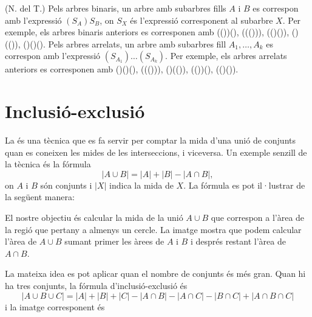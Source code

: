 (N. del T.) Pels arbres binaris, un arbre amb subarbres fills $A$ i
$B$ es correspon amb l'expressió $(S_A)S_B$, on $S_X$ és l'expressió
corresponent al subarbre $X$. Per exemple, els arbres binaris anteriors es
corresponen amb (())(), ((())), (()()), ()(()), ()()(). Pels arbres
arrelats, un arbre amb subarbres fill $A_1, \ldots, A_k$ es correspon
amb l'expressió $(S_{A_1})\ldots(S_{A_k})$. Per exemple, els arbres
arrelats anteriors es corresponen amb ()()(), ((())), ()(()), (())(), (()()).

\section{Inclusió-exclusió}


La  és una tècnica que es fa servir per comptar
la mida d'una unió de conjunts quan es coneixen les mides de les
interseccions, i viceversa. Un exemple senzill de la tècnica és la
fórmula
\[ |A \cup B| = |A| + |B| - |A \cap B|,\]
on $A$ i $B$ són conjunts i $|X|$ indica la mida de $X$. La fórmula es pot
il·lustrar de la següent manera:


\begin{center}
\end{center}


El nostre objectiu és calcular la mida de la unió $A \cup B$ que
correspon a l'àrea de la regió que pertany a almenys un cercle. La
imatge mostra que podem calcular l'àrea de $A \cup B$ sumant primer
les àrees de $A$ i $B$ i després restant l'àrea de $A \cap B$.

La mateixa idea es pot aplicar quan el nombre de conjunts és més
gran. Quan hi ha tres conjunts, la fórmula d'inclusió-exclusió és
\[ |A \cup B \cup C| = |A| + |B| + |C| - |A \cap B|  - |A \cap C|  - |B \cap C| + |A \cap B \cap C| \]
i la imatge corresponent és


\begin{center}
\end{center}


